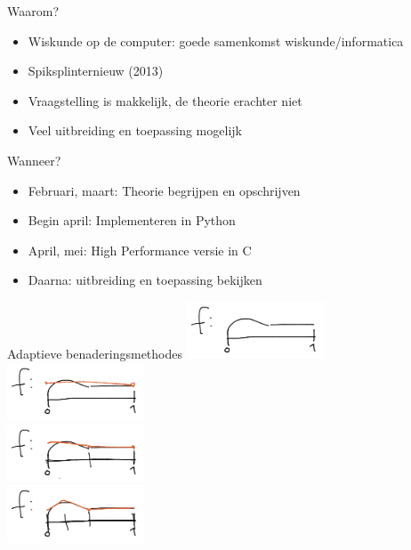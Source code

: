 \documentclass{beamer}
\begin{document}
\begin{frame}{Waarom?}
  \begin{itemize}
    \item Wiskunde op de computer: goede samenkomst wiskunde/informatica \pause
    \item Spiksplinternieuw (2013) \pause
    \item Vraagstelling is makkelijk, de theorie erachter niet \pause
    \item Veel uitbreiding en toepassing mogelijk
  \end{itemize}
\end{frame}

\begin{frame}{Wanneer?}
  \begin{itemize}
    \item Februari, maart: Theorie begrijpen en opschrijven \pause
    \item Begin april: Implementeren in Python \pause
    \item April, mei: High Performance versie in C \pause
    \item Daarna: uitbreiding en toepassing bekijken
  \end{itemize}
\end{frame}

\begin{frame}{Adaptieve benaderingsmethodes}
  \centering
  \includegraphics[height=1.7cm]{schets_0.png}\\
  \includegraphics[height=1.7cm]{schets_1.png}\\
  \includegraphics[height=1.7cm]{schets_2.png}\\
  \includegraphics[height=1.7cm]{schets_3.png}\\
\end{frame}
\end{document}
